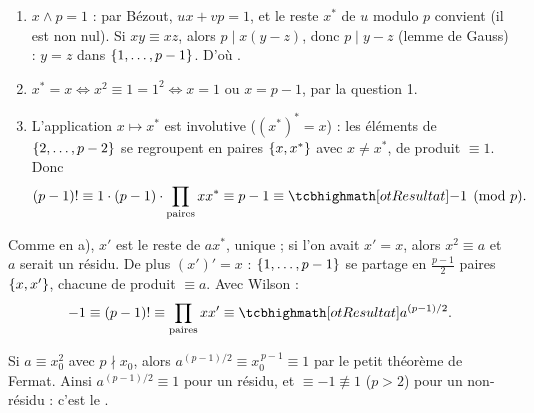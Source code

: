 \begin{corrigeEval}{}{}
\begin{questions}[start=4]
  \item \begin{enumerate}[label=\alph*)]
      \item $x\wedge p=1$ : par Bézout, $ux+vp=1$, et le reste $x^{*}$ de $u$
        modulo $p$ convient (il est non nul). Si $xy\equiv xz$, alors
        $p\mid x(y-z)$, donc $p\mid y-z$ (lemme de Gauss) : $y=z$ dans
        $\left\{1,\dots,p-1\right\}$. D'où .
      \item $x^{*}=x\iff x^{2}\equiv1=1^{2}\iff x=1$ ou $x=p-1$, par la
        question 1.
      \item L'application $x\mapsto x^{*}$ est involutive ($(x^{*})^{*}=x$) :
        les éléments de $\left\{2,\dots,p-2\right\}$ se regroupent en paires
        $\left\{x,x^{*}\right\}$ avec $x\neq x^{*}$, de produit $\equiv1$. Donc
        \[(p-1)!\equiv1\cdot(p-1)\cdot\prod_{\text{paires}}xx^{*}\equiv p-1\equiv\res{-1\pmod p}.\]
    \end{enumerate}
  \item Comme en a), $x'$ est le reste de $ax^{*}$, unique ; si l'on avait
    $x'=x$, alors $x^{2}\equiv a$ et $a$ serait un résidu. De plus
    $(x')'=x$ : $\left\{1,\dots,p-1\right\}$ se partage en $\frac{p-1}{2}$ paires
    $\left\{x,x'\right\}$, chacune de produit $\equiv a$. Avec Wilson :
    \[-1\equiv(p-1)!\equiv\prod_{\text{paires}}xx'\equiv\res{a^{(p-1)/2}}.\]
  \item Si $a\equiv x_0^{2}$ avec $p\nmid x_0$, alors
    $a^{(p-1)/2}\equiv x_0^{\,p-1}\equiv1$ par le petit théorème de Fermat.
    Ainsi $a^{(p-1)/2}\equiv1$ pour un résidu, et $\equiv-1\not\equiv1$
    ($p>2$) pour un non-résidu : c'est le .
\end{questions}
\end{corrigeEval}

